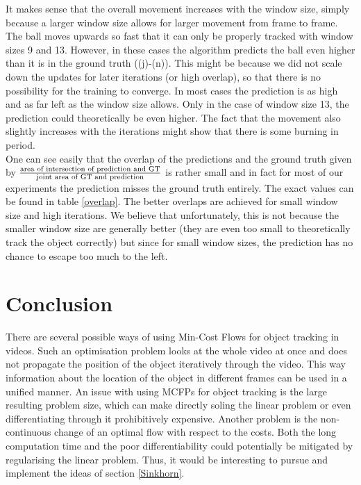 \documentclass{article}
\begin{document}
It makes sense that the overall movement increases with the window size, simply because a larger window size allows for larger movement from frame to frame. 
The ball moves upwards so fast that it can only be properly tracked with window sizes 9 and 13. However, in these cases the algorithm predicts the ball even higher than it is in the ground truth ((j)-(n)). This might be because we did not scale down the updates for later iterations (or high overlap), so that there is no possibility for the training to converge. In most cases the prediction is as high and as far left as the window size allows. Only in the case of window size 13, the prediction could theoretically be even higher. The fact that the movement also slightly increases with the iterations might show that there is some burning in period.\\
One can see easily that the overlap of the predictions and the ground truth given by $\frac{\textnormal{area of intersection of prediction and GT}}{\textnormal{joint area of GT and prediction}}$ is rather small and in fact for most of our experiments the prediction misses the ground truth entirely. The exact values can be found in table \ref{overlap}. The better overlaps are achieved for small window size and high iterations. We believe that unfortunately, this is not because the smaller window size are generally better (they are even too small to theoretically track the object correctly) but since for small window sizes, the prediction has no chance to escape too much to the left.

\section{Conclusion}
There are several possible ways of using Min-Cost Flows for object tracking in videos. Such an optimisation problem looks at the whole video at once and does not propagate the position of the object iteratively through the video. This way information about the location of the object in different frames can be used in a unified manner. An issue with using MCFPs for object tracking is the large resulting problem size, which can make directly soling the linear problem or even differentiating through it prohibitively expensive. Another problem is the non-continuous change of an optimal flow with respect to the costs. Both the long computation time and the poor differentiability could potentially be mitigated by regularising the linear problem. Thus, it would be interesting to pursue and implement the ideas of section \ref{Sinkhorn}.


\end{document}
